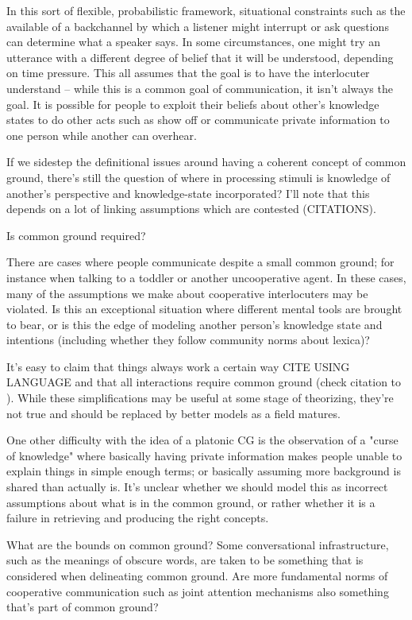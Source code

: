 \documentclass[]{article}
\begin{document}
In this sort of flexible, probabilistic framework, situational constraints such as the available of a backchannel by which a listener might interrupt or ask questions can determine what a speaker says. In some circumstances, one might try an utterance with a different degree of belief that it will be understood, depending on time pressure. This all assumes that the goal is to have the interlocuter understand -- while this is a common goal of communication, it isn't always the goal. It is possible for people to exploit their beliefs about other's knowledge states to do other acts such as show off or communicate private information to one person while another can overhear.  


If we sidestep the definitional issues around having a coherent concept of common ground, there's still the question of where in processing stimuli is knowledge of another's perspective and knowledge-state incorporated? I'll note that this depends on a lot of linking assumptions which are contested (CITATIONS). 



Is common ground required? 

There are cases where people communicate despite a small common ground; for instance when talking to a toddler or another uncooperative agent. In these cases, many of the assumptions we make about cooperative interlocuters may be violated. Is this an exceptional situation where different mental tools are brought to bear, or is this the edge of modeling another person's knowledge state and intentions (including whether they follow community norms about lexica)? 


It's easy to claim that things always work a certain way CITE USING LANGUAGE and that all interactions require common ground (check citation to \cite{clark1996}). While these simplifications may be useful at some stage of theorizing, they're not true and should be replaced by better models as a field matures. 


One other difficulty with the idea of a platonic CG is the observation of a "curse of knowledge" where basically having private information makes people unable to explain things in simple enough terms; or basically assuming more background is shared than actually is. It's unclear whether we should model this as incorrect assumptions about what is in the common ground, or rather whether it is a failure in retrieving and producing the right concepts. 

What are the bounds on common ground? Some conversational infrastructure, such as the meanings of obscure words, are taken to be something that is considered when delineating common ground. Are more fundamental norms of cooperative communication such as joint attention mechanisms also something that's part of common ground? 
\end{document}
